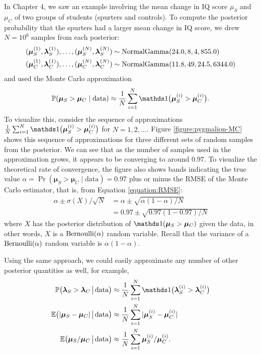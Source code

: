 \documentclass[12pt]{article}
\begin{document}
In Chapter 4, we saw an example involving the mean change in IQ score $\mu_S$ and $\mu_C$ of two groups of students (spurters and controls). 
To compute the posterior probability that the spurters had a larger mean change in IQ score, we drew $N=10^6$ samples from each posterior:
\begin{align*}
&(\bm\mu_S^{(1)},\bm\lambda_S^{(1)}),\dotsc,(\bm\mu_S^{(N)},\bm\lambda_S^{(N)})\sim \operatorname*{NormalGamma}(24.0,8,4,855.0)\\
&(\bm\mu_C^{(1)},\bm\lambda_C^{(1)}),\dotsc,(\bm\mu_C^{(N)},\bm\lambda_C^{(N)})\sim\operatorname*{NormalGamma}(11.8,49,24.5,6344.0)
\end{align*}
and used the Monte Carlo approximation
\begin{align*}
\Pr(\bm\mu_S > \bm\mu_C \mid \text{data}) 
\approx \frac{1}{N} \sum_{i = 1}^N \I\big(\bm\mu_S^{(i)}>\bm\mu_C^{(i)}\big).
\end{align*}
To visualize this, consider the sequence of approximations $\frac{1}{N} \sum_{i = 1}^N \I\big(\bm\mu_S^{(i)}>\bm\mu_C^{(i)}\big)$ for $N=1,2,\dotsc$.  Figure \ref{figure:pygmalion-MC} shows this sequence of approximations for three different sets of random samples from the posterior.  We can see that as the number of samples used in the approximation grows, it appears to be converging to around $0.97$.
To visualize the theoretical rate of convergence, the figure also shows bands indicating the true value $\alpha = \Pr(\bm\mu_S > \bm\mu_C \mid \text{data})=0.97$ plus or minus the RMSE of the Monte Carlo estimator, that is, from Equation \ref{equation:RMSE}:
\begin{align*}
\alpha \pm \sigma(X)/\sqrt{N} &= \alpha \pm \sqrt{\alpha(1-\alpha)/N}\\
&= 0.97 \pm \sqrt{0.97(1-0.97)/N}
\end{align*}
where $X$ has the posterior distribution of $\I(\bm\mu_S>\bm\mu_C)$ given the data, in other words, $X$ is a $\operatorname*{Bernoulli}(\alpha)$ random variable. 
Recall that the variance of a $\operatorname*{Bernoulli}(\alpha)$ random variable is $\alpha(1-\alpha)$.

Using the same approach, we could easily approximate any number of other posterior quantities as well, for example,
\begin{align*}
\Pr\big(\bm\lambda_S>\bm\lambda_C \,\big\vert\, \text{data}\big) 
&\approx \frac{1}{N}\sum_{i = 1}^N \I\big(\bm\lambda_S^{(i)}>\bm\lambda_C^{(i)}\big)\\
\E\big(|\bm\mu_S-\bm\mu_C| \,\big\vert\, \text{data}\big) 
&\approx \frac{1}{N}\sum_{i = 1}^N |\bm\mu_S^{(i)}-\bm\mu_C^{(i)}|\\
\E\big(\bm\mu_S/\bm\mu_C \,\big\vert\, \text{data}\big) 
&\approx \frac{1}{N}\sum_{i = 1}^N \bm\mu_S^{(i)}/\bm\mu_C^{(i)}.
\end{align*}
\end{document}
